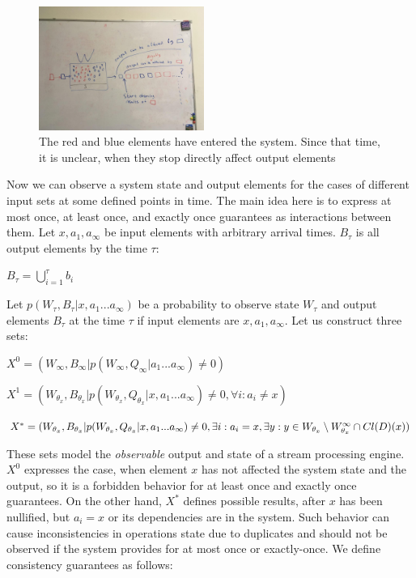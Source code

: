 \documentclass[sigconf]{acmart}
\theoremstyle{remark}
\begin{document}
\begin{figure}[htbp]
  \centering
  \includegraphics[width=0.48\textwidth]{pics/nullification}
  \caption{The red and blue elements have entered the system. Since that time, it is unclear, when they stop directly affect output elements}
  \label {nullification}
\end{figure}

Now we can observe a system state and output elements for the cases of different input sets at some defined points in time. The main idea here is to express at most once, at least once, and exactly once guarantees as interactions between them. Let $x,a_1,a_\infty$ be input elements with arbitrary arrival times. $B_\tau$ is all output elements by the time $\tau$:

$B_\tau=\bigcup\limits_{i=1}^{\tau}{b_i}$

Let $p(W_\tau,B_\tau|x,a_1...a_\infty)$ be a probability to observe state $W_\tau$ and output elements $B_\tau$ at the time $\tau$ if input elements are $x,a_1,a_\infty$. Let us construct three sets:

$X^0=(W_\infty,B_\infty|p(W_\infty,Q_\infty|a_1...a_\infty)\neq{0})$

$X^1=(W_{\theta_{x}},B_{\theta_{x}}|p(W_{\theta_{x}},Q_{\theta_{x}}|x,a_1...a_\infty)\neq{0},\forall{i}:{a_i}\neq{x})$

$X^{*}=(W_{\theta_{x}},B_{\theta_{x}}|p(W_{\theta_{x}},Q_{\theta_{x}}|x,a_1...a_\infty)\neq{0},\\
\exists{i}:{a_i={x}},\exists{y:y\in{W_{\theta_{x}}\setminus{W_{\theta_x}^{\infty}}}\cap{Cl(D)(x)}})$

These sets model the {\em observable} output and state of a stream processing engine. $X^0$ expresses the case, when element $x$ has not affected the system state and the output, so it is a forbidden behavior for at least once and exactly once guarantees. On the other hand, $X^{*}$ defines possible results, after $x$ has been nullified, but $a_i=x$ or its dependencies are in the system. Such behavior can cause inconsistencies in operations state due to duplicates and should not be observed if the system provides for at most once or exactly-once. We define consistency guarantees as follows: 
\end{document}
